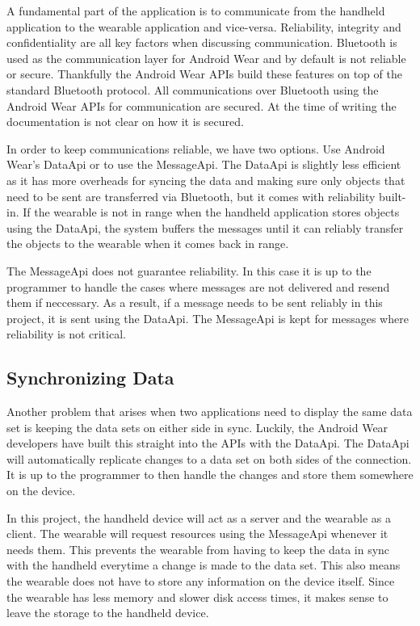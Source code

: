 A fundamental part of the application is to communicate from the handheld
application to the wearable application and vice-versa. Reliability, integrity
and confidentiality are all key factors when discussing communication. Bluetooth
is used as the communication layer for Android Wear and by default is not
reliable or secure. Thankfully the Android Wear APIs build these features on top
of the standard Bluetooth protocol. All communications over Bluetooth using the
Android Wear APIs for communication are secured. At the time of writing the
documentation is not clear on how it is secured.

In order to keep communications reliable, we have two options. Use Android
Wear's DataApi or to use the MessageApi. The DataApi is slightly less efficient
as it has more overheads for syncing the data and making sure only objects that
need to be sent are transferred via Bluetooth, but it comes with reliability
built-in. If the wearable is not in range when the handheld application stores
objects using the DataApi, the system buffers the messages until it can reliably
transfer the objects to the wearable when it comes back in range.

The MessageApi does not guarantee reliability. In this case it is up to the
programmer to handle the cases where messages are not delivered and resend them
if neccessary. As a result, if a message needs to be sent reliably in this
project, it is sent using the DataApi. The MessageApi is kept for messages where
reliability is not critical.

\subsection{Synchronizing Data}

Another problem that arises when two applications need to display the same data
set is keeping the data sets on either side in sync. Luckily, the Android Wear
developers have built this straight into the APIs with the DataApi. The DataApi
will automatically replicate changes to a data set on both sides of the
connection. It is up to the programmer to then handle the changes and store
them somewhere on the device.

In this project, the handheld device will act as a server and the wearable as a
client. The wearable will request resources using the MessageApi whenever it
needs them. This prevents the wearable from having to keep the data in sync with
the handheld everytime a change is made to the data set. This also means the
wearable does not have to store any information on the device itself. Since the
wearable has less memory and slower disk access times, it makes sense to leave
the storage to the handheld device.

